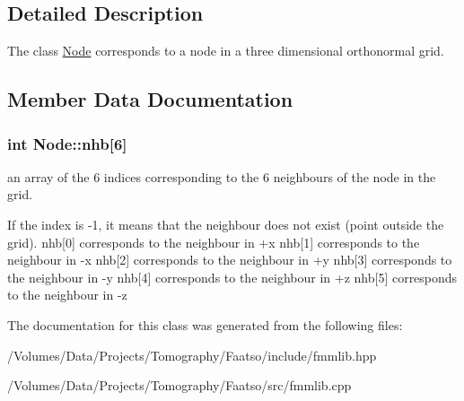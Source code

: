 \subsection{Detailed Description}
The class \hyperlink{class_node}{Node} corresponds to a node in a three dimensional orthonormal grid. 

\subsection{Member Data Documentation}
\hypertarget{class_node_a8c9884342c7159797193a004efc41487}{}
\subsubsection[{nhb}]{\setlength{\rightskip}{0pt plus 5cm}int Node\+::nhb\mbox{[}6\mbox{]}}\label{class_node_a8c9884342c7159797193a004efc41487}


an array of the 6 indices corresponding to the 6 neighbours of the node in the grid. 

If the index is -\/1, it means that the neighbour does not exist (point outside the grid). nhb\mbox{[}0\mbox{]} corresponds to the neighbour in +x nhb\mbox{[}1\mbox{]} corresponds to the neighbour in -\/x nhb\mbox{[}2\mbox{]} corresponds to the neighbour in +y nhb\mbox{[}3\mbox{]} corresponds to the neighbour in -\/y nhb\mbox{[}4\mbox{]} corresponds to the neighbour in +z nhb\mbox{[}5\mbox{]} corresponds to the neighbour in -\/z 

The documentation for this class was generated from the following files\+:\begin{DoxyCompactItemize}
\item 
/\+Volumes/\+Data/\+Projects/\+Tomography/\+Faatso/include/fmmlib.\+hpp\item 
/\+Volumes/\+Data/\+Projects/\+Tomography/\+Faatso/src/fmmlib.\+cpp\end{DoxyCompactItemize}
